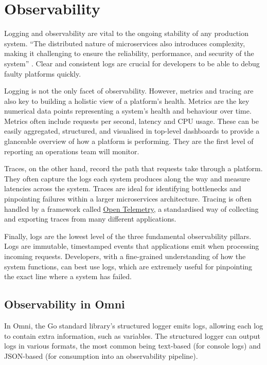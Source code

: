 \section{Observability}
Logging and observability are vital to the ongoing stability of any production system. ``The distributed nature of microservices also introduces complexity, making  it  challenging  to  ensure  the  reliability,  performance,  and  security  of  the  system'' \citep{chinamanagonda2022observability}.
Clear and consistent logs are crucial for developers to be able to debug faulty platforms quickly. 

Logging is not the only facet of observability. However, metrics and tracing are also key to building a holistic view of a platform's health.
Metrics are the key numerical data points representing a system's health and behaviour over time.
Metrics often include requests per second, latency and CPU usage. These can be easily aggregated, structured, and visualised in top-level dashboards to provide a glanceable overview of how a platform is performing.
They are the first level of reporting an operations team will monitor.

Traces, on the other hand, record the path that requests take through a platform. They often capture the logs each system produces along the way and measure latencies across the system.
Traces are ideal for identifying bottlenecks and pinpointing failures within a larger microservices architecture. Tracing is often handled by a framework called \underline{\href{https://opentelemetry.io}{Open Telemetry}}\nocite{opentel}, a standardised way of collecting and exporting traces from many different applications.

Finally, logs are the lowest level of the three fundamental observability pillars. Logs are immutable, timestamped events that applications emit when processing incoming requests.
Developers, with a fine-grained understanding of how the system functions, can best use logs, which are extremely useful for pinpointing the exact line where a system has failed. 

\subsection{Observability in Omni}
In Omni, the Go standard library's structured logger emits logs, allowing each log to contain extra information, such as variables.
The structured logger can output logs in various formats, the most common being text-based (for console logs) and JSON-based (for consumption into an observability pipeline).

